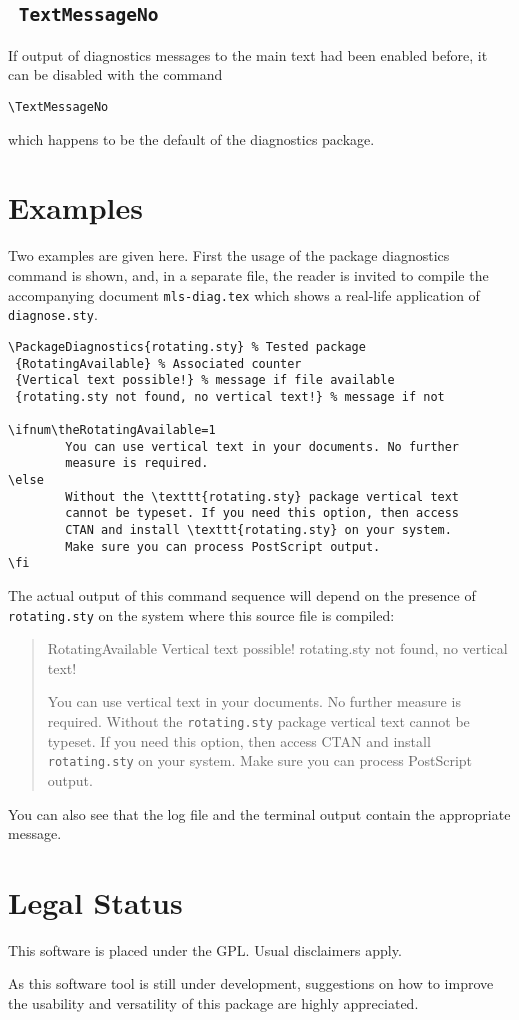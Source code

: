 \documentclass{ltxdoc}
\begin{document}
\subsection{\texttt{ TextMessageNo}}

If output of diagnostics messages to the main text had been enabled
before, it can be disabled with the command
\begin{verbatim}
\TextMessageNo
\end{verbatim}
which happens to be the default of the diagnostics package.

\section{Examples}

Two examples are given here. First the usage of the package
diagnostics command is shown, and, in a separate file, the
reader is invited to compile the accompanying document 
\texttt{mls-diag.tex} which shows a real-life application of
\texttt{diagnose.sty}.

\begin{verbatim}
\PackageDiagnostics{rotating.sty} % Tested package
 {RotatingAvailable} % Associated counter
 {Vertical text possible!} % message if file available
 {rotating.sty not found, no vertical text!} % message if not

\ifnum\theRotatingAvailable=1
        You can use vertical text in your documents. No further
        measure is required.
\else
        Without the \texttt{rotating.sty} package vertical text
        cannot be typeset. If you need this option, then access
        CTAN and install \texttt{rotating.sty} on your system.
        Make sure you can process PostScript output.
\fi
\end{verbatim}

The actual output of this command sequence will depend on the
presence of \texttt{rotating.sty} on the system where this source
file is compiled:
\begin{quote}
 {RotatingAvailable} %
 {Vertical text possible!} %
 {rotating.sty not found, no vertical text!} %

\ifnum{}
	You can use vertical text in your documents. No further
	measure is required.
\else
	Without the \texttt{rotating.sty} package vertical text
	cannot be typeset. If you need this option, then access
	CTAN and install \texttt{rotating.sty} on your system.
	Make sure you can process PostScript output.
\fi
\end{quote}

You can also see that the log file and the terminal output contain
the appropriate message.

\section{Legal Status}

This software is placed under the GPL. Usual disclaimers apply.

As this software tool is still under development, suggestions on how
to improve the usability and versatility of this package are highly
appreciated.
\end{document}
